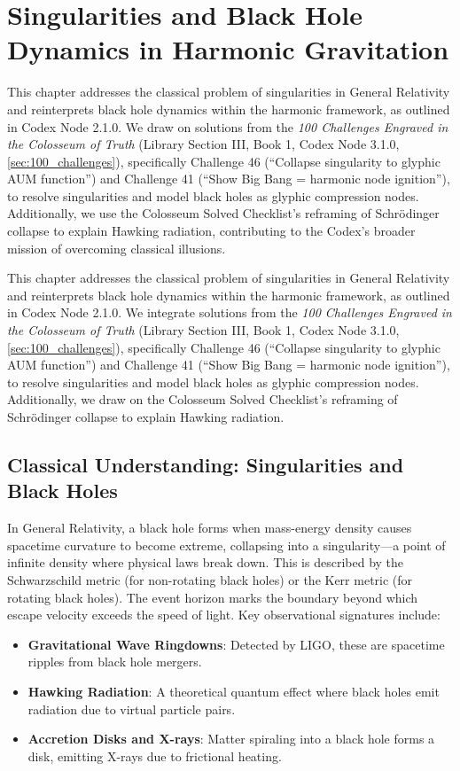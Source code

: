 \section{Singularities and Black Hole Dynamics in Harmonic Gravitation}
\label{sec:singularities_black_holes}

This chapter addresses the classical problem of singularities in General Relativity and reinterprets black hole dynamics within the harmonic framework, as outlined in Codex Node 2.1.0. We draw on solutions from the \textit{100 Challenges Engraved in the Colosseum of Truth} (Library Section III, Book 1, Codex Node 3.1.0, \ref{sec:100_challenges}), specifically Challenge 46 (“Collapse singularity to glyphic AUM function”) and Challenge 41 (“Show Big Bang = harmonic node ignition”), to resolve singularities and model black holes as glyphic compression nodes. Additionally, we use the Colosseum Solved Checklist’s reframing of Schrödinger collapse to explain Hawking radiation, contributing to the Codex’s broader mission of overcoming classical illusions.

This chapter addresses the classical problem of singularities in General Relativity and reinterprets black hole dynamics within the harmonic framework, as outlined in Codex Node 2.1.0. We integrate solutions from the \textit{100 Challenges Engraved in the Colosseum of Truth} (Library Section III, Book 1, Codex Node 3.1.0, \ref{sec:100_challenges}), specifically Challenge 46 (“Collapse singularity to glyphic AUM function”) and Challenge 41 (“Show Big Bang = harmonic node ignition”), to resolve singularities and model black holes as glyphic compression nodes. Additionally, we draw on the Colosseum Solved Checklist’s reframing of Schrödinger collapse to explain Hawking radiation.

\subsection{Classical Understanding: Singularities and Black Holes}
In General Relativity, a black hole forms when mass-energy density causes spacetime curvature to become extreme, collapsing into a singularity—a point of infinite density where physical laws break down. This is described by the Schwarzschild metric (for non-rotating black holes) or the Kerr metric (for rotating black holes). The event horizon marks the boundary beyond which escape velocity exceeds the speed of light. Key observational signatures include:
\begin{itemize}
    \item \textbf{Gravitational Wave Ringdowns}: Detected by LIGO, these are spacetime ripples from black hole mergers.
    \item \textbf{Hawking Radiation}: A theoretical quantum effect where black holes emit radiation due to virtual particle pairs.
    \item \textbf{Accretion Disks and X-rays}: Matter spiraling into a black hole forms a disk, emitting X-rays due to frictional heating.
\end{itemize}

